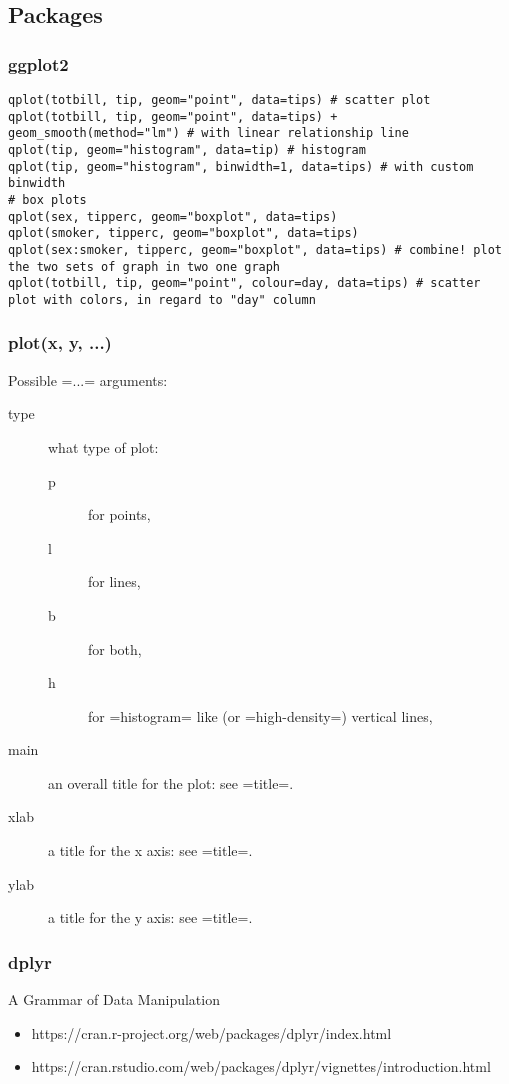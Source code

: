 \subsection{Packages}
\subsubsection{ggplot2}
\begin{lstlisting}
qplot(totbill, tip, geom="point", data=tips) # scatter plot
qplot(totbill, tip, geom="point", data=tips) + geom_smooth(method="lm") # with linear relationship line
qplot(tip, geom="histogram", data=tip) # histogram
qplot(tip, geom="histogram", binwidth=1, data=tips) # with custom binwidth
# box plots
qplot(sex, tipperc, geom="boxplot", data=tips)
qplot(smoker, tipperc, geom="boxplot", data=tips)
qplot(sex:smoker, tipperc, geom="boxplot", data=tips) # combine! plot the two sets of graph in two one graph
qplot(totbill, tip, geom="point", colour=day, data=tips) # scatter plot with colors, in regard to "day" column
\end{lstlisting}

\subsubsection{plot(x, y, ...)}
Possible =...= arguments:
\begin{description}
\item [type] what type of plot:
  \begin{description}
  \item [p] for points,
  \item [l] for lines,
  \item [b] for both,
  \item [h] for =histogram= like (or =high-density=) vertical lines,
  \end{description}
\item [main] an overall title for the plot: see =title=.
\item [xlab] a title for the x axis: see =title=.
\item [ylab] a title for the y axis: see =title=.
\end{description}

\subsubsection{dplyr}
A Grammar of Data Manipulation
\begin{itemize}
\item https://cran.r-project.org/web/packages/dplyr/index.html
\item https://cran.rstudio.com/web/packages/dplyr/vignettes/introduction.html
\end{itemize}





